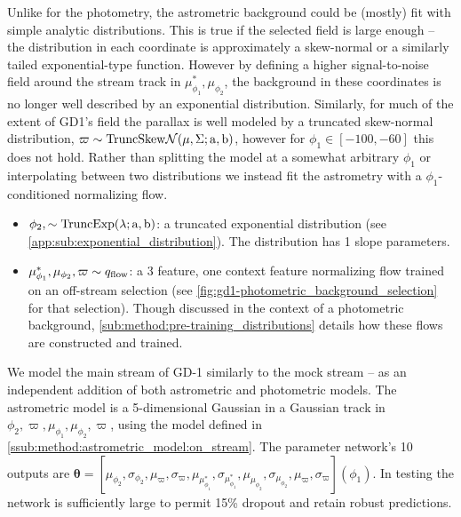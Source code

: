 \documentclass[twocolumn]{aastex631}
\newcommand{\stream}[1]{#1}
\newcommand{\mbs}[1]{\boldsymbol{#1}}
\newcommand{\mcal}[1]{\mathcal{#1}}
\newcommand{\parallax}{\varpi}
\begin{document}
        Unlike for the photometry, the astrometric background could be (mostly)
        fit with simple analytic distributions.  This is true if the selected
        field is large enough -- the distribution in each coordinate is
        approximately a skew-normal or a similarly tailed exponential-type
        function. However by defining a higher signal-to-noise field around the
        \citet{Ibata+2021} stream track in $\mu_{\phi_1}^*, \mu_{\phi_2}$, the
        background in these coordinates is no longer well described by an
        exponential distribution. Similarly, for much of the extent of
        \stream{GD1's} field the parallax is well modeled by a truncated
        skew-normal distribution, $\parallax \sim \rm{TruncSkew}\mcal{N}(\mu,
        \Sigma; a, b)$, however for $\phi_1 \in [-100, -60]$ this does not hold.
        Rather than splitting the model at a somewhat arbitrary $\phi_1$ or
        interpolating between two distributions we instead fit the astrometry
        with a $\phi_1$-conditioned normalizing flow.

        \begin{itemize}
            \item $\phi_2, \sim \rm{TruncExp}(\lambda; a, b)$: a truncated
                exponential distribution (see
                \autoref{app:sub:exponential_distribution}).  The distribution
                has 1 slope parameters.
            \item $\mu_{\phi_1}^*, \mu_{\phi_2}, \varpi \sim q_{\rm flow}$: a 3
                feature, one context feature normalizing flow trained on an
                off-stream selection (see
                \autoref{fig:gd1-photometric_background_selection} for that
                selection). Though discussed in the context of a photometric
                background, \autoref{sub:method:pre-training_distributions}
                details how these flows are constructed and trained.
        \end{itemize}

        We model the main stream of \stream{GD-1} similarly to the mock stream
        -- as an independent addition of both astrometric and photometric
        models.  The astrometric model is a 5-dimensional Gaussian in a Gaussian
        track in $\phi_2, \parallax, \mu_{\phi_1}, \mu_{\phi_2}, \parallax$,
        using the model defined in
        \autoref{ssub:method:astrometric_model:on_stream}.  The parameter
        network's
        10 outputs are $\mbs{\theta} = [\mu_{\phi_2}, \sigma_{\phi_2},
        \mu_\parallax, \sigma_\parallax, \mu_{\mu_{\phi_1}^*},
        \sigma_{\mu_{\phi_1}^*}, \mu_{\mu_{\phi_2}}, \sigma_{\mu_{\phi_2}},
        \mu_\parallax, \sigma_\parallax](\phi_1)$.  In testing the network is
        sufficiently large to permit 15\% dropout and retain robust predictions.
\end{document}
